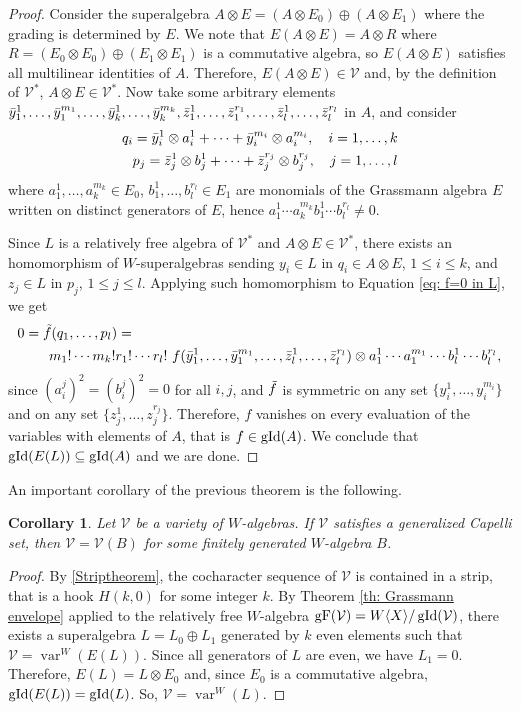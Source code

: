 \documentclass{article}
\newtheorem{corollary}[theorem]{Corollary}
\newcommand{\WX}{W\langle X\rangle}
\newcommand{\cV}{\mathcal{V}}
\DeclareMathOperator{\gid}{\textnormal{gId}}
\DeclareMathOperator{\var}{var}
\DeclareMathOperator{\F}{gF}
\begin{document}
\begin{proof}
    Consider the superalgebra $A\otimes E = (A\otimes E_0) \oplus (A\otimes E_1)$ where the grading is determined by $E$. We note that $E(A\otimes E)= A\otimes R$ where $R=(E_0\otimes E_0) \oplus (E_1 \otimes E_1)$ is a commutative algebra, so $E(A\otimes E)$ satisfies all multilinear identities of $A$. Therefore, $E(A\otimes E)\in \cV$ and, by the definition of $\cV^*$, $A\otimes E\in \cV^*$. Now take some arbitrary elements $\Bar{y}_1^1,\ldots,\Bar{y}_1^{m_1}, \ldots,\Bar{y}_k^1,\ldots,\Bar{y}_k^{m_k}, \Bar{z}_1^1,\ldots,\Bar{z}_1^{r_1}, \ldots, \Bar{z}_l^1,\ldots,\Bar{z}_l^{r_l}$ in $A$, and consider 
    \begin{align*}
        q_i=\Bar{y}_i^1 \otimes a_i^1+\cdots+\Bar{y}_i^{m_i}\otimes a_i^{m_i}, \quad i=1,\ldots,k\\
        p_j=\Bar{z}_j^1\otimes b_j^1+\cdots+\Bar{z}_j^{r_j} \otimes b_j^{r_j}, \quad j=1,\ldots,l
    \end{align*}
    where $a_1^1,\ldots,a_k^{m_k} \in E_0$, $b_1^1,\ldots,b_l^{r_l}\in E_1$ are monomials of the Grassmann algebra $E$ written on distinct generators of $E$, hence $a_1^1\cdots a_k^{m_k}b_1^1\cdots b_l^{r_l} \neq 0$.

    Since $L$ is a relatively free algebra of $\cV^*$ and $A\otimes E\in \cV^*$, there exists an homomorphism of $W$-superalgebras sending $y_i\in L$ in $q_i\in A\otimes E$, $1 \le i \le k$, and $z_j\in L$ in $p_j$, $1 \le j \le l$. Applying such homomorphism to Equation \ref{eq: f=0 in L}, we get
    \begin{align*}
    0=\Tilde{f}(q_1,\ldots,p_l)=&\\
    m_1!\cdots m_k!r_1!&\cdots r_l!\ f(\Bar{y}_1^1,\ldots,\Bar{y}_1^{m_1},\ldots,\Bar{z}_l^1,\ldots,\Bar{z}_l^{r_l}) \otimes a_1^1\cdots a_1^{m_1}\cdots b_l^1 \cdots b_l^{r_l},
 \end{align*}
 since $(a_i^j)^2=(b_i^j)^2=0$ for all $i,j$, and $\Tilde{f}$ is symmetric on any set $\{ y_i^1,\ldots,y_i^{m_i} \}$ and on any set $\{ z_j^1,\ldots,z_j^{r_j} \}$.
 Therefore, $f$ vanishes on every evaluation of the variables with elements of $A$, that is $f\in \gid(A)$. We conclude that $\gid(E(L))\subseteq \gid(A)$ and we are done.
\end{proof}

An important corollary of the previous theorem is the following.

\begin{corollary}\label{cor: fin_gen}
	Let $\cV$ be a variety of $W$-algebras. If $\cV$ satisfies a generalized Capelli set, then $\cV=\cV(B)$ for some finitely generated $W$-algebra $B$.
\end{corollary}
\begin{proof}
    By \ref{Striptheorem}, the cocharacter sequence of $\cV$ is contained in a strip, that is a hook $H(k,0)$ for some integer $k$. By Theorem \ref{th: Grassmann envelope} applied to the relatively free $W$-algebra $\F(\cV)=\WX / \gid(\cV)$, there exists a superalgebra $L=L_0\oplus L_1$ generated by $k$ even elements such that $\cV=\var^W(E(L))$. Since all generators of $L$ are even, we have $L_1=0$. Therefore, $E(L)=L\otimes E_0$ and, since $E_0$ is a commutative algebra, $\gid(E(L))=\gid(L)$. So, $\cV=\var^W(L)$.
\end{proof}
\end{document}
